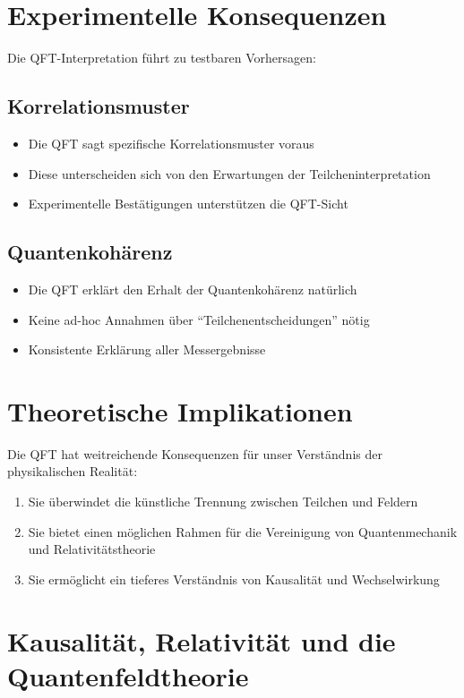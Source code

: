 \documentclass{article}
\begin{document}
	\section{Experimentelle Konsequenzen}
	Die QFT-Interpretation führt zu testbaren Vorhersagen:
	
	\subsection{Korrelationsmuster}
	\begin{itemize}
		\item Die QFT sagt spezifische Korrelationsmuster voraus
		\item Diese unterscheiden sich von den Erwartungen der Teilcheninterpretation
		\item Experimentelle Bestätigungen \cite{walborn2002} unterstützen die QFT-Sicht
	\end{itemize}
	
	\subsection{Quantenkohärenz}
	\begin{itemize}
		\item Die QFT erklärt den Erhalt der Quantenkohärenz natürlich
		\item Keine ad-hoc Annahmen über ``Teilchenentscheidungen'' nötig
		\item Konsistente Erklärung aller Messergebnisse
	\end{itemize}
	
	\section{Theoretische Implikationen}
	Die QFT hat weitreichende Konsequenzen für unser Verständnis der physikalischen Realität:
	
	\begin{enumerate}
		\item Sie überwindet die künstliche Trennung zwischen Teilchen und Feldern
		\item Sie bietet einen möglichen Rahmen für die Vereinigung von Quantenmechanik und Relativitätstheorie
		\item Sie ermöglicht ein tieferes Verständnis von Kausalität und Wechselwirkung
	\end{enumerate}
	\section{Kausalität, Relativität und die Quantenfeldtheorie}
	
\end{document}
